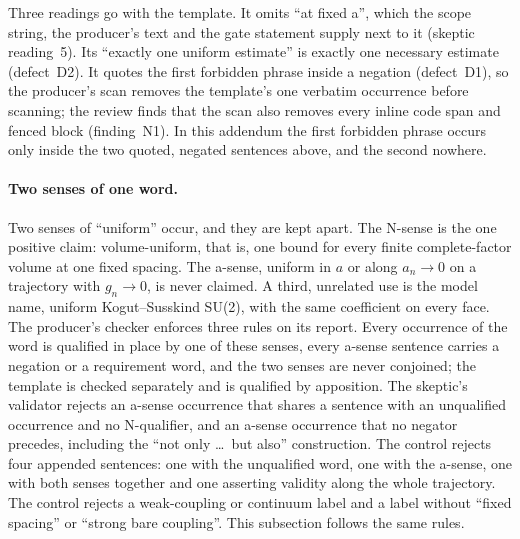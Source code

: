 Three readings go with the template. It omits ``at fixed a'', which the scope
string, the producer's text and the gate statement supply next to it (skeptic
reading~5). Its ``exactly one uniform estimate'' is exactly one necessary
estimate (defect~D2). It quotes the first forbidden phrase inside a negation
(defect~D1), so the producer's scan removes the template's one verbatim
occurrence before scanning; the review finds that the scan also removes every
inline code span and fenced block (finding~N1). In this addendum the first
forbidden phrase occurs only inside the two quoted, negated sentences above,
and the second nowhere.

\paragraph{Two senses of one word.}
Two senses of ``uniform'' occur, and they are kept apart. The N-sense is the
one positive claim: volume-uniform, that is, one bound for every finite
complete-factor volume at one fixed spacing. The a-sense, uniform in $a$ or
along $a_n\to0$ on a trajectory with $g_n\to0$, is never claimed. A third,
unrelated use is the model name, uniform Kogut--Susskind SU(2), with the same
coefficient on every face. The producer's checker enforces three rules on its
report. Every occurrence of the word is qualified in place by one of these
senses, every a-sense sentence carries a negation or a requirement word, and
the two senses are never conjoined; the template is checked separately and
is qualified by apposition. The skeptic's validator rejects an a-sense
occurrence that shares a sentence with an unqualified occurrence and no
N-qualifier, and an a-sense occurrence that no negator precedes, including
the ``not only \ldots\ but also'' construction. The control
 rejects four appended sentences: one with the
unqualified word, one with the a-sense, one with both senses together and one
asserting validity along the whole trajectory. The control
 rejects a weak-coupling or continuum
label and a label without ``fixed spacing'' or ``strong bare coupling''. This
subsection follows the same rules.

